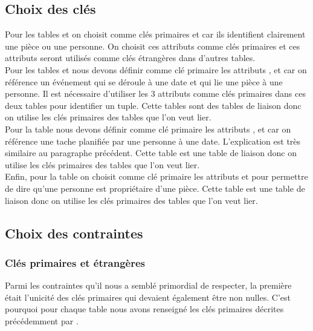 \subsection{Choix des clés}
Pour les tables \textbf{} et \textbf{} on choisit comme clés primaires  et  car ils identifient clairement une pièce ou une personne. On choisit ces attributs comme clés primaires et ces attributs seront utilisés comme clés étrangères dans d'autres tables.\\

Pour les tables \textbf{} et \textbf{} nous devons définir comme clé primaire les attributs ,  et  car on référence un événement qui se déroule à une date et qui lie une pièce à une personne. Il est nécessaire d'utiliser les 3 attributs comme clés primaires dans ces deux tables pour identifier un tuple. Cette tables sont des tables de liaison donc on utilise les clés primaires des tables que l'on veut lier.\\

Pour la table \textbf{}  nous devons définir comme clé primaire les attributs ,  et  car on référence une tache planifiée par une personne à une date. L'explication est très similaire au paragraphe précédent. Cette table est une table de liaison donc on utilise les clés primaires des tables que l'on veut lier.\\

Enfin, pour la table \textbf{} on choisit comme clé primaire les attributs  et  pour permettre de dire qu'une personne est propriétaire d'une pièce. Cette table est une table de liaison donc on utilise les clés primaires des tables que l'on veut lier.


\subsection{Choix des contraintes}
\subsubsection{Clés primaires et étrangères}
	Parmi les contraintes qu'il nous a semblé primordial de respecter, la première était l'unicité des clés primaires qui devaient également être non nulles. C'est pourquoi pour chaque table nous avons renseigné les clés primaires décrites précédemment par .\\

